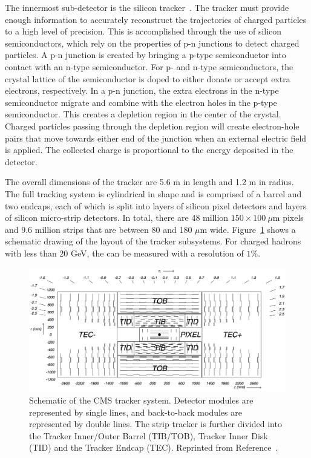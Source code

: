 The innermost sub-detector is the silicon tracker~\cite{trackerTDR,trackerTDRAddendum}. The tracker must provide enough information to accurately reconstruct the trajectories of charged particles to a high level of precision. This is accomplished through the use of silicon semiconductors, which rely on the properties of p-n junctions to detect charged particles. A p-n junction is created by bringing a p-type semiconductor into contact with an n-type semiconductor. For p- and n-type semiconductors, the crystal lattice of the semiconductor is doped to either donate or accept extra electrons, respectively. In a p-n junction, the extra electrons in the n-type semiconductor migrate and combine with the electron holes in the p-type semiconductor. This creates a depletion region in the center of the crystal. Charged particles passing through the depletion region will create electron-hole pairs that move towards either end of the junction when an external electric field is applied. The collected charge is proportional to the energy deposited in the detector.

The overall dimensions of the tracker are 5.6 m in length and 1.2 m in radius. The full tracking system is cylindrical in shape and is comprised of a barrel and two endcaps, each of which is split into layers of silicon pixel detectors and layers of silicon micro-strip detectors. In total, there are 48 million $150\times100~\mu$m pixels and 9.6 million strips that are between 80 and 180 $\mu$m wide. Figure~\ref{fig:TrackerLayout} shows a schematic drawing of the layout of the tracker subsystems. For charged hadrons with \pt less than 20 GeV, the \pt can be measured with a resolution of $1\%$. 

\begin{figure}[h!]
	\centering
	\includegraphics[width=\linewidth]{Figures/Detector/tracker_layout.png}
       \caption{Schematic of the CMS tracker system. Detector modules are represented by single lines, and back-to-back modules are represented by double lines. The strip tracker is further divided into the Tracker Inner/Outer Barrel (TIB/TOB), Tracker Inner Disk (TID) and the Tracker Endcap (TEC). Reprinted from Reference~\cite{Chatrchyan2008zzk}.}
   	\label{fig:TrackerLayout}
\end{figure}

